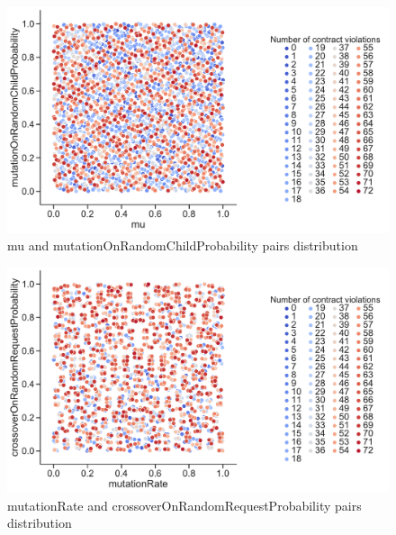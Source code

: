 \begin{figure}
	\centering
	\includegraphics[width=\textwidth]{images/PairsDistr/mu_mutationOnRandomChildProbability.pdf}
	\caption[]{mu and mutationOnRandomChildProbability pairs distribution}
	\label{fig:mu_mutationOnRandomChildProbability_pair}
\end{figure}


\begin{figure}
	\centering
	\includegraphics[width=\textwidth]{images/PairsDistr/mutationRate_crossoverOnRandomRequestProbability.pdf}
	\caption[]{mutationRate and crossoverOnRandomRequestProbability pairs distribution}
	\label{fig:mutationRate_crossoverOnRandomRequestProbability_pair}
\end{figure}


